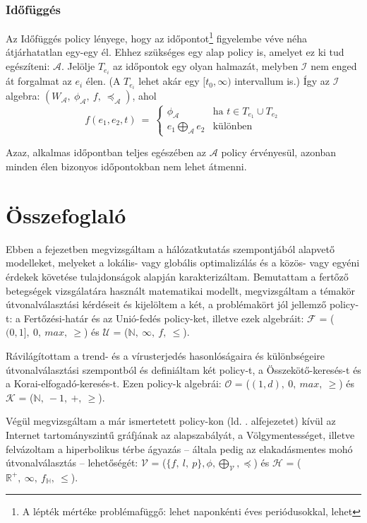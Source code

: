       \subsubsection{Időfüggés}
      Az Időfüggés policy lényege, hogy az időpontot\footnote{A lépték mértéke problémafüggő: lehet naponkénti éves periódusokkal, lehet } figyelembe véve néha átjárhatatlan egy-egy él. Ehhez szükséges egy alap policy is, amelyet ez ki tud egészíteni: $\mathcal{A}$. Jelölje $T_{e_i}$ az időpontok egy olyan halmazát, melyben $\mathcal{I}$ nem enged át forgalmat az $e_i$ élen. (A $T_{e_i}$ lehet akár egy $[t_0, \infty)$ intervallum is.) Így az $\mathcal{I}$ algebra: $(W_{\mathcal{A}},~\phi_{\mathcal{A}},~f,~\preceq_{\mathcal{A}})$, ahol
      $$f(e_1,e_2,t)~=~
      \begin{cases}
        \phi_{\mathcal{A}} & \text{ha } t \in T_{e_1} \cup T_{e_2}\\
        e_1 \bigoplus_{\mathcal{A}} e_2 & \text{különben}
      \end{cases}$$

      Azaz, alkalmas időpontban teljes egészében az $\mathcal{A}$ policy érvényesül, azonban minden élen bizonyos időpontokban nem lehet átmenni.\\

  \section{Összefoglaló}
  Ebben a fejezetben megvizsgáltam a hálózatkutatás szempontjából alapvető modelleket, melyeket a lokális- vagy globális optimalizálás és a közös- vagy egyéni érdekek követése tulajdonságok alapján karakterizáltam. Bemutattam a fertőző betegségek vizsgálatára használt matematikai modellt, megvizsgáltam a témakör útvonalválasztási kérdéseit és kijelöltem a két, a problémakört jól jellemző policy-t: a Fertőzési-határ és az Unió-fedés policy-ket, illetve ezek algebráit: $\mathcal{F}$ = ($(0,1],~0,~max,~\geq$) és $\mathcal{U}$ = ($\mathbb{N},~\infty,~f,~\leq$).

  Rávilágítottam a trend- és a vírusterjedés hasonlóságaira és különbségeire útvonalválasztási szempontból és definiáltam két policy-t, a Összekötő-keresés-t és a Korai-elfogadó-keresés-t. Ezen policy-k algebrái: $\mathcal{O}$ = ($(1,d),~0,~max,~\geq$) és $\mathcal{K}$ = ($\mathbb{N},~-1,~+,~\geq$).

  Végül megvizsgáltam a már ismertetett policy-kon (ld. . alfejezetet) kívül az Internet tartományszintű gráfjának az alapszabályát, a Völgymentességet, illetve felvázoltam a hiperbolikus térbe ágyazás -- általa pedig az elakadásmentes mohó útvonalválasztás -- lehetőségét: $\mathcal{V}$ = ($\{f,~l,~p\},\phi,\bigoplus_{\mathcal{V}},\preceq$) és $\mathcal{H}$ = ($\mathbb{R}^{+},~\infty,~f_{\mathbb{H}},~\leq$).
